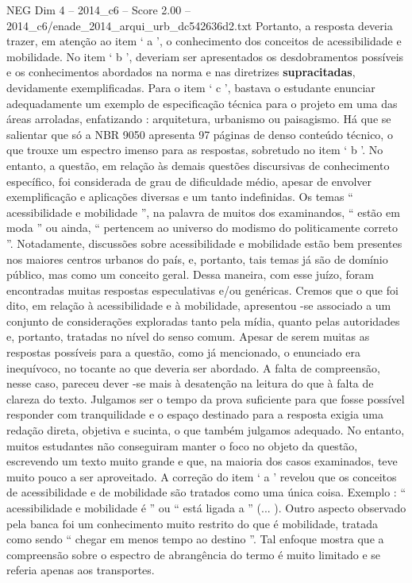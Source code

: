 \begin{textsample}{NEG Dim 4 – 2014\_c6 – Score 2.00 – 2014\_c6/enade\_2014\_arqui\_urb\_dc542636d2.txt}
Portanto, a resposta deveria trazer, em atenção ao item ‘ a ’, o conhecimento dos conceitos de acessibilidade e mobilidade.
No item ‘ b ’, deveriam ser apresentados os desdobramentos possíveis e os conhecimentos abordados na norma e nas diretrizes \textbf{supracitadas}, devidamente exemplificadas.
Para o item ‘ c ’, bastava o estudante enunciar adequadamente um exemplo de especificação técnica para o projeto em uma das áreas arroladas, enfatizando : arquitetura, urbanismo ou paisagismo.
Há que se salientar que só a NBR 9050 apresenta 97 páginas de denso conteúdo técnico, o que trouxe um espectro imenso para as respostas, sobretudo no item ‘ b ’.
No entanto, a questão, em relação às demais questões discursivas de conhecimento específico, foi considerada de grau de dificuldade médio, apesar de envolver exemplificação e aplicações diversas e um tanto indefinidas.
Os temas “ acessibilidade e mobilidade ”, na palavra de muitos dos examinandos, “ estão em moda ” ou ainda, “ pertencem ao universo do modismo do politicamente correto ”.
Notadamente, discussões sobre acessibilidade e mobilidade estão bem presentes nos maiores centros urbanos do país, e, portanto, tais temas já são de domínio público, mas como um conceito geral.
Dessa maneira, com esse juízo, foram encontradas muitas respostas especulativas e/ou genéricas.
Cremos que o que foi dito, em relação à acessibilidade e à mobilidade, apresentou -se associado a um conjunto de considerações exploradas tanto pela mídia, quanto pelas autoridades e, portanto, tratadas no nível do senso comum.
Apesar de serem muitas as respostas possíveis para a questão, como já mencionado, o enunciado era inequívoco, no tocante ao que deveria ser abordado.
A falta de compreensão, nesse caso, pareceu dever -se mais à desatenção na leitura do que à falta de clareza do texto.
Julgamos ser o tempo da prova suficiente para que fosse possível responder com tranquilidade e o espaço destinado para a resposta exigia uma redação direta, objetiva e sucinta, o que também julgamos adequado.
No entanto, muitos estudantes não conseguiram manter o foco no objeto da questão, escrevendo um texto muito grande e que, na maioria dos casos examinados, teve muito pouco a ser aproveitado.
A correção do item ‘ a ’ revelou que os conceitos de acessibilidade e de mobilidade são tratados como uma única coisa.
Exemplo : “ acessibilidade e mobilidade é ” ou “ está ligada a ” (... ).
Outro aspecto observado pela banca foi um conhecimento muito restrito do que é mobilidade, tratada como sendo “ chegar em menos tempo ao destino ”.
Tal enfoque mostra que a compreensão sobre o espectro de abrangência do termo é muito limitado e se referia apenas aos transportes.

\end{textsample}
